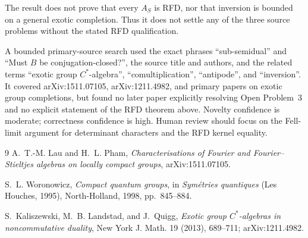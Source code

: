 \documentclass[11pt,a4paper]{article}
\begin{document}
The result does not prove that every $A_S$ is RFD, nor that inversion is bounded
on a general exotic completion.  Thus it does not settle any of the three source
problems without the stated RFD qualification.

A bounded primary-source search used the exact phrases ``sub-semidual'' and
``Must $B$ be conjugation-closed?'', the source title and authors, and the
related terms ``exotic group $C^*$-algebra'', ``comultiplication'', ``antipode'',
and ``inversion''.  It covered arXiv:1511.07105, arXiv:1211.4982, and primary
papers on exotic group completions, but found no later paper explicitly
resolving Open Problem~3 and no explicit statement of the RFD theorem above.
Novelty confidence is moderate; correctness confidence is high.  Human review
should focus on the Fell-limit argument for determinant characters and the RFD
kernel equality.

\begin{thebibliography}{9}
A.~T.-M. Lau and H.~L. Pham,
\emph{Characterisations of Fourier and Fourier--Stieltjes algebras on locally
compact groups}, arXiv:1511.07105.

S.~L. Woronowicz,
\emph{Compact quantum groups}, in \emph{Sym\'etries quantiques} (Les Houches,
1995), North-Holland, 1998, pp.~845--884.

S.~Kaliszewski, M.~B. Landstad, and J.~Quigg,
\emph{Exotic group $C^*$-algebras in noncommutative duality},
New York J. Math. 19 (2013), 689--711; arXiv:1211.4982.
\end{thebibliography}
\end{document}
